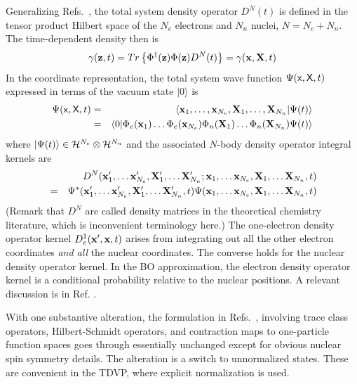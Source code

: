 Generalizing Refs.~\cite{BLWSBT99a,BLWSBT00a}, the total system density
operator $D^{N}(t)$ is defined in the tensor product Hilbert space of the $%
N_{e}$ electrons and $N_{n}$ nuclei, $N=N_{e}+N_{n}$. The time-dependent
density then is 
\begin{equation}
\gamma ({\bf z},t)=Tr\left\{ \Phi ^{\dagger }({\bf z})\Phi ({\bf z}%
)D^{N}(t)\right\} =\gamma ({\bf x},{\bf X},t)
\end{equation}%
In the coordinate representation, the total system wave function $\Psi ({\sf %
x},{\sf X},t)$ expressed in terms of the vacuum state $|0\rangle $ is 
\begin{eqnarray}
\Psi ({\sf x},{\sf X},t) &=&\langle {\bf x}_{1},\ldots ,{\bf x}_{N_{e}},{\bf %
X}_{1},\ldots ,{\bf X}_{N_{n}}|\Psi (t)\rangle  \nonumber \\
&=&\langle 0|\Phi _{e}({\bf x}_{1})\ldots \Phi _{e}({\bf x}_{N_{e}})\Phi
_{n}({\bf X}_{1})\ldots \Phi _{n}({\bf X}_{N_{n}})\Psi (t)\rangle
\end{eqnarray}%
where $|\Psi (t)\rangle \in {\cal H}^{N_{e}}\otimes {\cal H}^{N_{n}}$ and
the associated $N$-body density operator integral kernels are 
\begin{eqnarray}
&&D^{N}({\bf x}_{1}^{\prime },\ldots {\bf x}_{N_{e}}^{\prime },{\bf X}%
_{1}^{\prime },\ldots {\bf X}_{N_{n}}^{\prime };{\bf x}_{1},\ldots {\bf x}%
_{N_{e}},{\bf X}_{1},\ldots {\bf X}_{N_{n}},t)  \nonumber \\
&=&\Psi ^{\ast }({\bf x}_{1}^{\prime },\ldots {\bf x}_{N_{e}}^{\prime },{\bf %
X}_{1}^{\prime },\ldots {\bf X}_{N_{n}}^{\prime },t)\Psi ({\bf x}_{1},\ldots 
{\bf x}_{N_{e}},{\bf X}_{1},\ldots {\bf X}_{N_{n}},t)
\end{eqnarray}%
(Remark that $D^N$ are called density matrices in the theoretical chemistry
literature, which is inconvenient terminology here.) The one-electron
density operator kernel $D_{e}^{1}({\bf x}^{\prime },{\bf x},t)$ arises from
integrating out all the other electron coordinates {\em and all} the nuclear
coordinates. The converse holds for the nuclear density operator kernel. In
the BO approximation, the electron density operator kernel is a conditional
probability relative to the nuclear positions. A relevant discussion is in
Ref. \cite{Sjoqvist}.

With one substantive alteration, the formulation in Refs.~\cite%
{BLWSBT99a,BLWSBT00a}, involving trace class operators, Hilbert-Schmidt
operators, and contraction maps to one-particle function spaces goes through
essentially unchanged except for obvious nuclear spin symmetry details. The
alteration is a switch to unnormalized states. These are convenient in the
TDVP, where explicit normalization is used.

